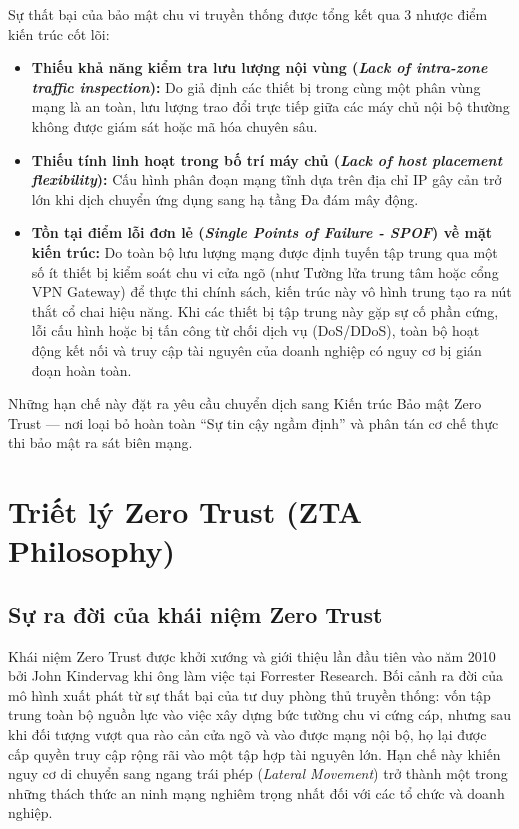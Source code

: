 Sự thất bại của bảo mật chu vi truyền thống được tổng kết qua 3 nhược điểm kiến trúc cốt lõi:
\begin{itemize}
    \item \textbf{Thiếu khả năng kiểm tra lưu lượng nội vùng (\textit{Lack of intra-zone traffic inspection}):} Do giả định các thiết bị trong cùng một phân vùng mạng là an toàn, lưu lượng trao đổi trực tiếp giữa các máy chủ nội bộ thường không được giám sát hoặc mã hóa chuyên sâu.
    \item \textbf{Thiếu tính linh hoạt trong bố trí máy chủ (\textit{Lack of host placement flexibility}):} Cấu hình phân đoạn mạng tĩnh dựa trên địa chỉ IP gây cản trở lớn khi dịch chuyển ứng dụng sang hạ tầng Đa đám mây động.
    \item \textbf{Tồn tại điểm lỗi đơn lẻ (\textit{Single Points of Failure - SPOF}) về mặt kiến trúc:} Do toàn bộ lưu lượng mạng được định tuyến tập trung qua một số ít thiết bị kiểm soát chu vi cửa ngõ (như Tường lửa trung tâm hoặc cổng VPN Gateway) để thực thi chính sách, kiến trúc này vô hình trung tạo ra nút thắt cổ chai hiệu năng. Khi các thiết bị tập trung này gặp sự cố phần cứng, lỗi cấu hình hoặc bị tấn công từ chối dịch vụ (DoS/DDoS), toàn bộ hoạt động kết nối và truy cập tài nguyên của doanh nghiệp có nguy cơ bị gián đoạn hoàn toàn.
\end{itemize}

Những hạn chế này đặt ra yêu cầu chuyển dịch sang Kiến trúc Bảo mật Zero Trust — nơi loại bỏ hoàn toàn ``Sự tin cậy ngầm định'' và phân tán cơ chế thực thi bảo mật ra sát biên mạng.
\section{Triết lý Zero Trust (ZTA Philosophy)}
\label{sec:1_3}

\subsection{Sự ra đời của khái niệm Zero Trust}
\label{subsec:1_3_1}

Khái niệm Zero Trust được khởi xướng và giới thiệu lần đầu tiên vào năm 2010 bởi John Kindervag khi ông làm việc tại Forrester Research. Bối cảnh ra đời của mô hình xuất phát từ sự thất bại của tư duy phòng thủ truyền thống: vốn tập trung toàn bộ nguồn lực vào việc xây dựng bức tường chu vi cứng cáp, nhưng sau khi đối tượng vượt qua rào cản cửa ngõ và vào được mạng nội bộ, họ lại được cấp quyền truy cập rộng rãi vào một tập hợp tài nguyên lớn. Hạn chế này khiến nguy cơ di chuyển sang ngang trái phép (\textit{Lateral Movement}) trở thành một trong những thách thức an ninh mạng nghiêm trọng nhất đối với các tổ chức và doanh nghiệp.

